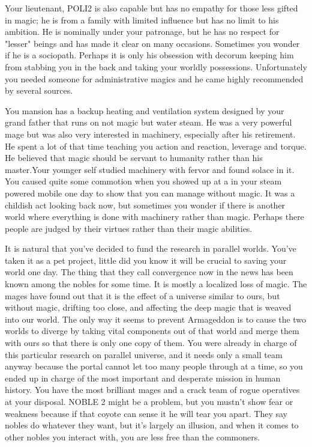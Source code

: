 \documentclass[char]{guildcamp3}
\begin{document}
Your lieutenant, POLI2 is also capable but has no empathy for those less gifted in magic; he is from a family with limited influence but has no limit to his ambition. He is nominally under your patronage, but he has no respect for "lesser" beings and has made it clear on many occasions. Sometimes you wonder if he is a sociopath. Perhaps it is only his obsession with decorum keeping him from stabbing you in the back and taking your worldly possessions. Unfortunately you needed someone for administrative magics and he came highly recommended by several sources. 

You mansion has a backup heating and ventilation system designed by your grand father that runs on not magic but water steam. He was a very powerful mage but was also very interested in machinery, especially after his retirement. He spent a lot of that time teaching you action and reaction, leverage and torque. He believed that magic should be servant to humanity rather than his master.Your younger self studied machinery with fervor and found solace in it. You caused quite some commotion when you showed up at a in your steam powered mobile one day to show that you can manage without magic. It was a childish act looking back now, but sometimes you wonder if there is another world where everything is done with machinery rather than magic. Perhaps there people are judged by their virtues rather than their magic abilities.

It is natural that you've decided to fund the research in parallel worlds. You've taken it as a pet project, little did you know it will be crucial to saving your world one day. The thing that they call convergence now in the news has been known among the nobles for some time. It is mostly a localized loss of magic. The mages have found out that it is the effect of a universe similar to ours, but without magic, drifting too close, and affecting the deep magic that is weaved into our world. The only way it seems to prevent Armageddon is to cause the two worlds to diverge by taking vital components out of that world and merge them with ours so that there is only one copy of them. You were already in charge of this particular research on parallel universe, and it needs only a small team anyway because the portal cannot let too many people through at a time, so you ended up in charge of the most important and desperate mission in human history. You have the most brilliant mages and a crack team of rogue operatives at your disposal. NOBLE 2 might be a problem, but you mustn't show fear or weakness because if that coyote can sense it he will tear you apart. They say nobles do whatever they want, but it's largely an illusion, and when it comes to other nobles you interact with, you are less free than the commoners.
\end{document}
